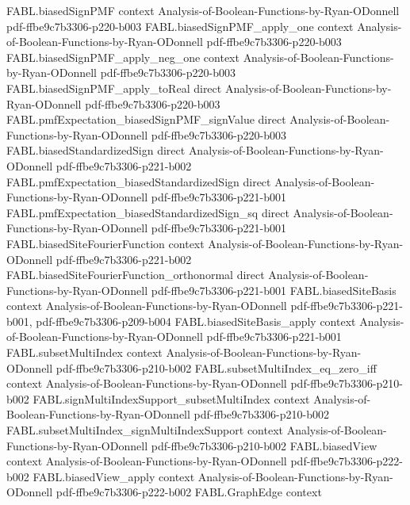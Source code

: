 \begin{theorem}
\proofstep
  {FABL.biasedSignPMF}
  {context}
  {Analysis-of-Boolean-Functions-by-Ryan-ODonnell}
  {pdf-ffbe9c7b3306-p220-b003}
\proofstep
  {FABL.biasedSignPMF_apply_one}
  {context}
  {Analysis-of-Boolean-Functions-by-Ryan-ODonnell}
  {pdf-ffbe9c7b3306-p220-b003}
\proofstep
  {FABL.biasedSignPMF_apply_neg_one}
  {context}
  {Analysis-of-Boolean-Functions-by-Ryan-ODonnell}
  {pdf-ffbe9c7b3306-p220-b003}
\proofstep
  {FABL.biasedSignPMF_apply_toReal}
  {direct}
  {Analysis-of-Boolean-Functions-by-Ryan-ODonnell}
  {pdf-ffbe9c7b3306-p220-b003}
\proofstep
  {FABL.pmfExpectation_biasedSignPMF_signValue}
  {direct}
  {Analysis-of-Boolean-Functions-by-Ryan-ODonnell}
  {pdf-ffbe9c7b3306-p220-b003}
\proofstep
  {FABL.biasedStandardizedSign}
  {direct}
  {Analysis-of-Boolean-Functions-by-Ryan-ODonnell}
  {pdf-ffbe9c7b3306-p221-b002}
\proofstep
  {FABL.pmfExpectation_biasedStandardizedSign}
  {direct}
  {Analysis-of-Boolean-Functions-by-Ryan-ODonnell}
  {pdf-ffbe9c7b3306-p221-b001}
\proofstep
  {FABL.pmfExpectation_biasedStandardizedSign_sq}
  {direct}
  {Analysis-of-Boolean-Functions-by-Ryan-ODonnell}
  {pdf-ffbe9c7b3306-p221-b001}
\proofstep
  {FABL.biasedSiteFourierFunction}
  {context}
  {Analysis-of-Boolean-Functions-by-Ryan-ODonnell}
  {pdf-ffbe9c7b3306-p221-b002}
\proofstep
  {FABL.biasedSiteFourierFunction_orthonormal}
  {direct}
  {Analysis-of-Boolean-Functions-by-Ryan-ODonnell}
  {pdf-ffbe9c7b3306-p221-b001}
\proofstep
  {FABL.biasedSiteBasis}
  {context}
  {Analysis-of-Boolean-Functions-by-Ryan-ODonnell}
  {pdf-ffbe9c7b3306-p221-b001,
    pdf-ffbe9c7b3306-p209-b004}
\proofstep
  {FABL.biasedSiteBasis_apply}
  {context}
  {Analysis-of-Boolean-Functions-by-Ryan-ODonnell}
  {pdf-ffbe9c7b3306-p221-b001}
\proofstep
  {FABL.subsetMultiIndex}
  {context}
  {Analysis-of-Boolean-Functions-by-Ryan-ODonnell}
  {pdf-ffbe9c7b3306-p210-b002}
\proofstep
  {FABL.subsetMultiIndex_eq_zero_iff}
  {context}
  {Analysis-of-Boolean-Functions-by-Ryan-ODonnell}
  {pdf-ffbe9c7b3306-p210-b002}
\proofstep
  {FABL.signMultiIndexSupport_subsetMultiIndex}
  {context}
  {Analysis-of-Boolean-Functions-by-Ryan-ODonnell}
  {pdf-ffbe9c7b3306-p210-b002}
\proofstep
  {FABL.subsetMultiIndex_signMultiIndexSupport}
  {context}
  {Analysis-of-Boolean-Functions-by-Ryan-ODonnell}
  {pdf-ffbe9c7b3306-p210-b002}
\proofstep
  {FABL.biasedView}
  {context}
  {Analysis-of-Boolean-Functions-by-Ryan-ODonnell}
  {pdf-ffbe9c7b3306-p222-b002}
\proofstep
  {FABL.biasedView_apply}
  {context}
  {Analysis-of-Boolean-Functions-by-Ryan-ODonnell}
  {pdf-ffbe9c7b3306-p222-b002}
\proofstep
  {FABL.GraphEdge}
  {context}

\end{theorem}
